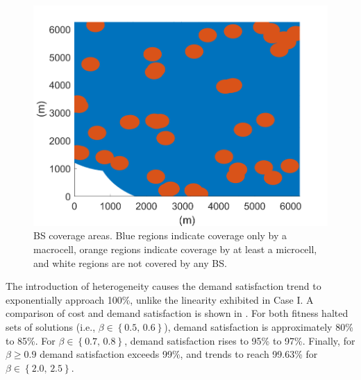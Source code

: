 \documentclass[12pt,dvipsnames]{report}
\begin{document}
\begin{figure}[htp]
	\centering
	\includegraphics[height=0.4\textheight]{Figures/CaseII_BSCoverageAreas}
	\caption[BS coverage areas used in the model for Case II simulations]{BS coverage areas.  Blue regions indicate coverage only by a macrocell, orange regions indicate coverage by at least a microcell, and white regions are not covered by any BS.}
	\label{fig:CaseII_BSCoverageAreas}
\end{figure}

The introduction of heterogeneity causes the demand satisfaction trend to exponentially approach 100\%, unlike the linearity exhibited in Case I.  A comparison of cost and demand satisfaction is shown in .  For both fitness halted sets of solutions (i.e., $\beta \in \left\{ 0.5,\, 0.6 \right\}$), demand satisfaction is approximately 80\% to 85\%.  For $\beta \in \left\{ 0.7,\, 0.8 \right\}$, demand satisfaction rises to 95\% to 97\%.  Finally, for $\beta \geq 0.9$ demand satisfaction exceeds 99\%, and trends to reach 99.63\% for $\beta \in \left\{ 2.0,\, 2.5 \right\}$.
\end{document}
